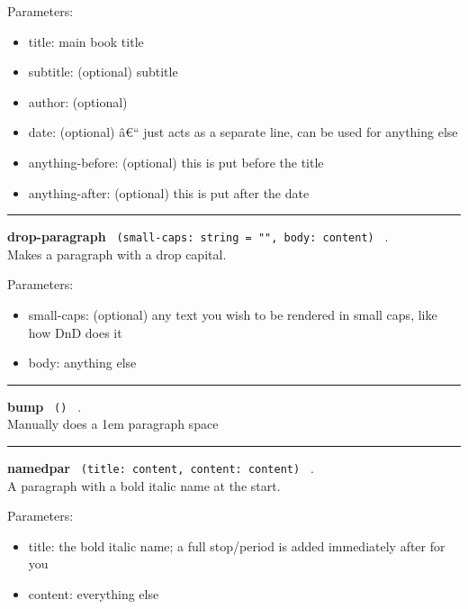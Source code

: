 Parameters:

\begin{itemize}
\tightlist
\item
  title: main book title
\item
  subtitle: (optional) subtitle
\item
  author: (optional)
\item
  date: (optional) â€`` just acts as a separate line, can be used for
  anything else
\item
  anything-before: (optional) this is put before the title
\item
  anything-after: (optional) this is put after the date
\end{itemize}

\begin{center}\rule{0.5\linewidth}{0.5pt}\end{center}

\textbf{drop-paragraph}
\texttt{\ (small-caps:\ string\ =\ "",\ body:\ content)\ } .\\
Makes a paragraph with a drop capital.

Parameters:

\begin{itemize}
\tightlist
\item
  small-caps: (optional) any text you wish to be rendered in small caps,
  like how DnD does it
\item
  body: anything else
\end{itemize}

\begin{center}\rule{0.5\linewidth}{0.5pt}\end{center}

\textbf{bump} \texttt{\ ()\ } .\\
Manually does a 1em paragraph space

\begin{center}\rule{0.5\linewidth}{0.5pt}\end{center}

\textbf{namedpar} \texttt{\ (title:\ content,\ content:\ content)\ } .\\
A paragraph with a bold italic name at the start.

Parameters:

\begin{itemize}
\tightlist
\item
  title: the bold italic name; a full stop/period is added immediately
  after for you
\item
  content: everything else
\end{itemize}

